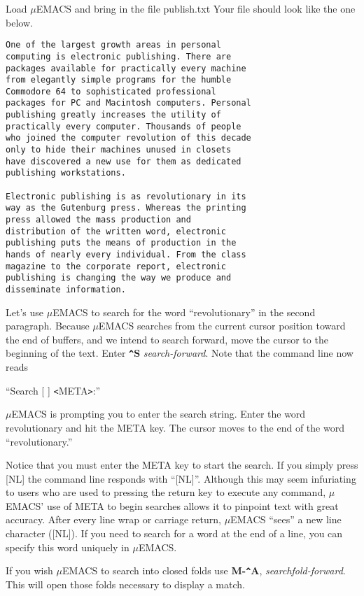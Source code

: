 Load $\mu$EMACS and bring in the file publish.txt Your file should look
like the one below.

\begin{verbatim}
One of the largest growth areas in personal
computing is electronic publishing. There are
packages available for practically every machine
from elegantly simple programs for the humble
Commodore 64 to sophisticated professional
packages for PC and Macintosh computers. Personal
publishing greatly increases the utility of
practically every computer. Thousands of people
who joined the computer revolution of this decade
only to hide their machines unused in closets
have discovered a new use for them as dedicated
publishing workstations.

Electronic publishing is as revolutionary in its
way as the Gutenburg press. Whereas the printing
press allowed the mass production and
distribution of the written word, electronic
publishing puts the means of production in the
hands of nearly every individual. From the class
magazine to the corporate report, electronic
publishing is changing the way we produce and
disseminate information.
\end{verbatim}

Let's use $\mu$EMACS to search for the word ``revolutionary'' in the
second paragraph. Because $\mu$EMACS searches from the current cursor
position toward the end of buffers, and we intend to search forward,
move the cursor to the beginning of the text. Enter {\bf \verb+^+S}
{\it search-forward}. Note that the command line now reads

``Search [ ] \verb+<+META\verb+>+:''

$\mu$EMACS is prompting you to enter the search string.  Enter the word
revolutionary and hit the META key. The cursor moves to the end of the
word ``revolutionary.''

Notice that you must enter the META key to start the search. If you
simply press [NL] the command line responds with ``[NL]''. Although this
may seem infuriating to users who are used to pressing the return key
to execute any command, $\mu$EMACS' use of META to begin searches allows
it to pinpoint text with great accuracy. After every line wrap or
carriage return, $\mu$EMACS ``sees'' a new line character ([NL]). If you need
to search for a word at the end of a line, you can specify this word
uniquely in $\mu$EMACS.

If you wish $\mu$EMACS to search into closed folds use {\bf
M-\verb+^+A}, {\it searchfold-forward}. This will open those folds
necessary to display a match.

